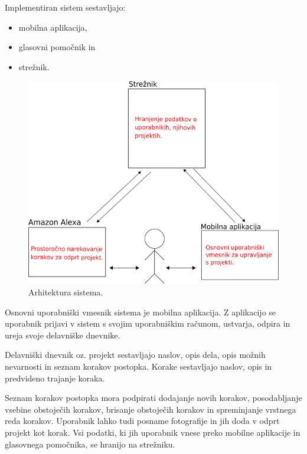 \documentclass[a4paper, 12pt]{book}
\begin{document}
Implementiran sistem sestavljajo:
\begin{itemize}
	\item mobilna aplikacija,
	\item glasovni pomočnik in
	\item strežnik.
\end{itemize}

\clearpage

\begin{figure}[H]
\begin{center}
\includegraphics[width=13cm]{plan_simple}
\end{center}
\caption{Arhitektura sistema.}
\label{plan_simple}
\end{figure}


Osnovni uporabniški vmesnik sistema je mobilna aplikacija.
Z aplikacijo se uporabnik prijavi v sistem s svojim uporabniškim računom, ustvarja, odpira in ureja svoje delavniške dnevnike.

Delavniški dnevnik oz. projekt sestavljajo naslov, opis dela, opis možnih nevarnosti in seznam korakov postopka.
Korake sestavljajo naslov, opis in predvideno trajanje koraka.

Seznam korakov postopka mora podpirati dodajanje novih korakov, posodabljanje vsebine obstoječih korakov, brisanje obstoječih korakov in spreminjanje vrstnega reda korakov.
Uporabnik lahko tudi posname fotografije in jih doda v odprt projekt kot korak.
Vsi podatki, ki jih uporabnik vnese preko mobilne aplikacije in glasovnega pomočnika, se hranijo na strežniku.
\end{document}
